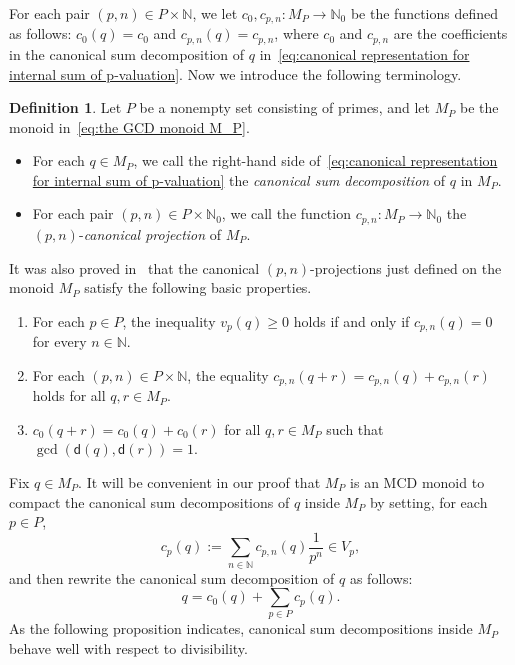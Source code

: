 \documentclass[10pt]{amsart}
\theoremstyle{definition}
\newtheorem{definition}[theorem]{Definition}
\theoremstyle{remark}
\numberwithin{equation}{section}
\newcommand{\nn}{\mathbb{N}}
\begin{document}
For each pair $(p,n) \in P \times \nn$, we let $c_0, c_{p,n} \colon M_P \to \nn_0$ be the functions defined as follows: $c_0(q) = c_0$ and $c_{p,n}(q) = c_{p,n}$, where $c_0$ and $c_{p,n}$ are the coefficients in the canonical sum decomposition of $q$ in~\eqref{eq:canonical representation for internal sum of p-valuation}. Now we introduce the following terminology.

\begin{definition}
  Let $P$ be a nonempty set consisting of primes, and let $M_P$ be the monoid in~\eqref{eq:the GCD monoid M_P}.
  \begin{itemize}
    \item For each $q \in M_P$, we call the right-hand side of~\eqref{eq:canonical representation for internal sum of p-valuation} the \emph{canonical sum decomposition} of $q$ in $M_P$.
      \smallskip

    \item For each pair $(p,n) \in P \times \nn_0$, we call the function $c_{p,n} \colon M_P \to \nn_0$ the $(p,n)$-\emph{canonical projection} of $M_P$.
  \end{itemize}
\end{definition}

It was also proved in~\cite[Proposition~5.6]{CGGP25} that the canonical $(p,n)$-projections just defined on the monoid $M_P$ satisfy the following basic properties.
\begin{enumerate}
  \item For each $p \in P$, the inequality $v_p(q) \ge 0$ holds if and only if $c_{p,n}(q) = 0$ for every $n \in \nn$.
    \smallskip

  \item For each $(p,n) \in P \times \nn$, the equality $c_{p,n}(q+r) = c_{p,n}(q) + c_{p,n}(r)$ holds for all $q,r \in M_P$.
    \smallskip

  \item $c_0(q+r) = c_0(q) + c_0(r)$ for all $q,r \in M_P$ such that $\gcd(\mathsf{d}(q), \mathsf{d}(r)) = 1$.
\end{enumerate}

Fix $q \in M_P$. It will be convenient in our proof that $M_P$ is an MCD monoid to compact the canonical sum decompositions of $q$ inside $M_P$ by setting, for each $p \in P$,
\[
  c_p(q) := \sum_{n \in \nn} c_{p,n}(q)\frac1{p^n} \in V_p,
\]
and then rewrite
the canonical sum decomposition of $q$ as follows:
\begin{equation}
    q = c_0(q) + \sum_{p \in P} c_p(q).
\end{equation}
As the following proposition indicates, canonical sum decompositions inside $M_P$ behave well with respect to divisibility.
\smallskip
\end{document}
